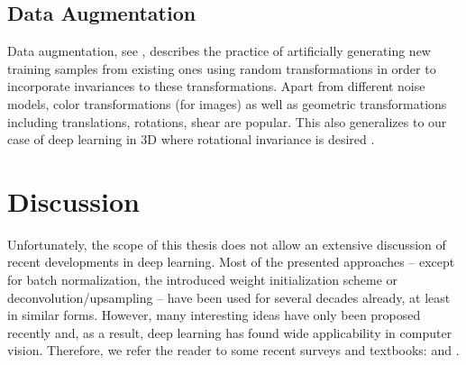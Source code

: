 
\subsection{Data Augmentation}
\label{sec:deep-learning-augmentation}

Data augmentation, see \cite[Section~7.4]{GoodfellowBengioCourville:2016}, 
describes the practice of artificially generating new training samples
from existing ones using random transformations in order to
incorporate invariances to these transformations. Apart from different noise models,
color transformations (for images)
as well as geometric transformations including translations, rotations,
shear \etc are popular. This also generalizes to our case of deep learning
in 3D where \eg rotational invariance is desired \cite{QiGuibas:2016,HedgeZadeh:2016}.

\section{Discussion}

Unfortunately, the scope of this thesis does not allow an extensive discussion
of recent developments in deep learning. Most of the presented
approaches -- except for \eg batch normalization, the introduced
weight initialization scheme or deconvolution/upsampling -- have been used for
several decades already, at least in similar forms. However, many interesting
ideas have only been proposed recently and, as a result, deep learning has 
found wide applicability in computer vision. Therefore, we refer the reader
to some recent surveys and textbooks: 
\cite{Schmidhuber:2014,WangRajXing:2017,Li:2017,
BengioCourvilleVincent:2012,LeCunBengioGeoffrey:2015} and
\cite{GoodfellowBengioCourville:2016}. 

